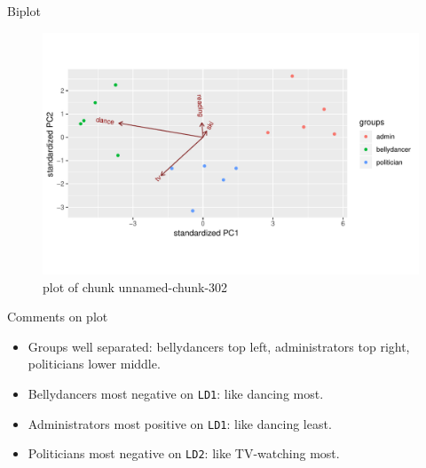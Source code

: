 \documentclass[ignorenonframetext,]{beamer}
\newenvironment{Shaded}{\begin{snugshade}}{\end{snugshade}}
\newcommand{\DataTypeTok}[1]{\textcolor[rgb]{0.13,0.29,0.53}{#1}}
\newcommand{\FloatTok}[1]{\textcolor[rgb]{0.00,0.00,0.81}{#1}}
\newcommand{\KeywordTok}[1]{\textcolor[rgb]{0.13,0.29,0.53}{\textbf{#1}}}
\newcommand{\NormalTok}[1]{#1}
\newcommand{\OperatorTok}[1]{\textcolor[rgb]{0.81,0.36,0.00}{\textbf{#1}}}
\begin{document}
\begin{frame}[fragile]{Biplot}
\protect\hypertarget{biplot}{}

\begin{Shaded}
\end{Shaded}

\begin{figure}
\centering
\includegraphics{figure/unnamed-chunk-302-1.pdf}
\caption{plot of chunk unnamed-chunk-302}
\end{figure}

\end{frame}

\begin{frame}[fragile]{Comments on plot}
\protect\hypertarget{comments-on-plot}{}

\begin{itemize}
\item
  Groups well separated: bellydancers top left, administrators top
  right, politicians lower middle.
\item
  Bellydancers most negative on \texttt{LD1}: like dancing most.
\item
  Administrators most positive on \texttt{LD1}: like dancing least.
\item
  Politicians most negative on \texttt{LD2}: like TV-watching most.
\end{itemize}

\end{frame}
\end{document}
